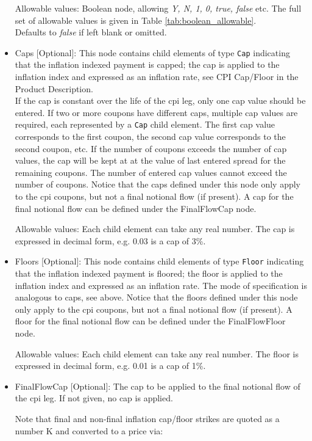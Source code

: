 \begin{itemize}
Allowable values: Boolean node, allowing \emph{Y, N, 1, 0, true, false} etc. The full set of allowable values is given in Table \ref{tab:boolean_allowable}.
\\Defaults to \emph{false}  if left blank or omitted.

\item Caps [Optional]: This node contains child elements of type
  \lstinline!Cap! indicating that the inflation indexed payment is
  capped; the cap is applied to the inflation index and expressed as
  an inflation rate, see CPI Cap/Floor in the Product Description. \\
  If the cap is constant over the life of the 
cpi leg, only one cap value should
be entered. If two or more coupons have different caps, multiple cap values
are required, each represented by a \lstinline!Cap! child element. The first cap value
corresponds to the first coupon, the second cap value corresponds to the
second coupon, etc. If the number of coupons exceeds the number of cap
values, the cap will be kept at at the value of last entered spread for the
remaining coupons. The number of entered cap values cannot exceed the
number of coupons. Notice that the caps defined under this node only apply to the cpi coupons,
but not a final notional flow (if present). A cap for the final notional flow can be defined
under the FinalFlowCap node.

Allowable values: Each child element can take any real number. The cap is
expressed in decimal form, e.g. 0.03 is a cap of 3\%.

\item Floors [Optional]: This node contains child elements of type
  \lstinline!Floor! indicating that the inflation indexed payment is
  floored; the floor is applied to the inflation index and expressed as
  an inflation rate. The mode of specification is analogous to caps, see
  above. Notice that the floors defined under this node only apply to the cpi coupons,
  but not a final notional flow (if present). A floor for the final notional flow can be defined
  under the FinalFlowFloor node.

Allowable values: Each child element can take any real number. The floor is
expressed in decimal form, e.g. 0.01 is a cap of 1\%.

\item FinalFlowCap [Optional]: The cap to be applied to the final notional flow of the cpi leg. If not given, no cap
  is applied.

Note that final and non-final inflation cap/floor strikes are quoted as a number K and converted to a price via:


\end{itemize}
